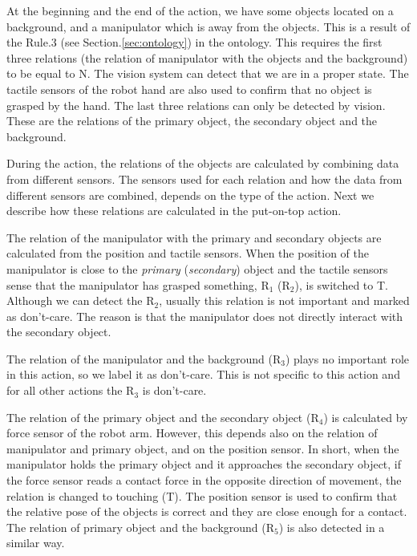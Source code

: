 At the beginning and the end of the action, we have some objects located on a background, and a manipulator which is away from the objects.
This is a result of the Rule.3 (see Section.\ref{sec:ontology}) in the ontology.
This requires the first three relations (the relation of manipulator with the objects and the background) to be equal to N.
The vision system can detect that we are in a proper state.
The tactile sensors of the robot hand are also used to confirm that no object is grasped by the hand.
The last three relations can only be detected by vision.
These are the relations of the primary object, the secondary object and the background.

During the action, the relations of the objects are calculated by combining data from different sensors.
The sensors used for each relation and how the data from different sensors are combined, depends on the type of the action.
Next we describe how these relations are calculated in the put-on-top action.

The relation of the manipulator with the primary and secondary objects are calculated from the position and tactile sensors.
When the position of the manipulator is close to the \textit{primary} (\textit{secondary}) object and the tactile sensors sense that the manipulator has grasped something,
$\text{R}_1$ ($\text{R}_2$), is switched to T.
Although we can detect the $\text{R}_2$, usually this relation is not important and marked as don't-care.
The reason is that the manipulator does not directly interact with the secondary object.

The relation of the manipulator and the background ($\text{R}_3$) plays no important role in this action, so we label it as don't-care.
This is not specific to this action and for all other actions the $\text{R}_3$ is don't-care.


The relation of the primary object and the secondary object ($\text{R}_4$) is calculated by force sensor of the robot arm.
However, this depends also on the relation of manipulator and primary object, and on the position sensor.
In short, when the manipulator holds the primary object and it approaches the secondary object,
if the force sensor reads a contact force in the opposite direction of movement, the relation is changed to touching (T).
The position sensor is used to confirm that the relative pose of the objects is correct and they are close enough for a contact.
The relation of primary object and the background ($\text{R}_5$) is also detected in a similar way.


